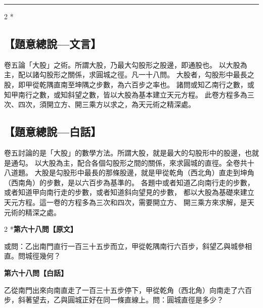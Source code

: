 \documentclass[11pt,a4paper]{article}
\newcommand{\longline}{\noindent\rule{\textwidth}{0.4pt}}
\begin{document}
\vspace{0.3cm}
\longline
\vspace{0.3cm}

\begin{paracol}{2}
\switchcolumn[0]*\subsection*{【題意總說---文言】}
{\small 卷五論「大股」之術。所謂大股，乃最大勾股形之股邊，即通股也。
以大股為主，配以諸勾股形之關係，求圓城之徑。凡一十八問。
大股者，勾股形中最長之股，即甲從乾隅直南至坤隅之步數，為六百步之率也。
諸問或知乙南行之數，或知甲南行之數，或知斜望之數，皆以大股為基本建立天元方程。
此卷方程多為三次、四次，須開立方、開三乘方以求之，為天元術之精深處。}

\switchcolumn\subsection*{【題意總說---白話】}
{\small 卷五討論的是「大股」的數學方法。所謂大股，就是最大的勾股形中的股邊，也就是通勾。
以大股為主，配合各個勾股形之間的關係，來求圓城的直徑。全卷共十八道題。
大股是勾股形中最長的那條股邊，就是甲從乾角（西北角）直走到坤角（西南角）的步數，是以六百步為基準的。
各題中或者知道乙向南行走的步數，或者知道甲向南行走的步數，或者知道斜向望見的步數，
都以大股為基礎來建立天元方程。這一卷的方程多為三次和四次，需要開立方、
開三乘方來求解，是天元術的精深之處。}
\end{paracol}

\vspace{0.3cm}

\begin{paracol}{2}
\switchcolumn[0]*\noindent\textbf{第六十八問【原文】}

\small 或問：乙出南門直行一百三十五步而立，甲從乾隅南行六百步，斜望乙與城參相直。問城徑幾何？

\switchcolumn\noindent\textbf{第六十八問【白話】}

\small 乙從南門出來向南直走了一百三十五步停下，甲從乾角（西北角）向南走了六百步，斜著望去，乙與圓城正好在同一條直線上。問：圓城直徑是多少？
\end{paracol}

\vspace{0.1cm}
\noindent{}
\par\vspace{0.15cm}
\end{document}
